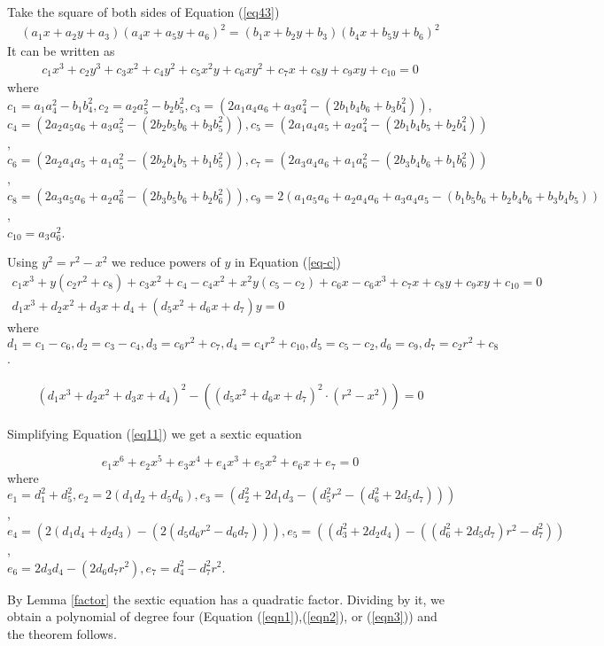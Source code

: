 \documentclass[10pt]{article}
\newenvironment{proof}{\begingroup\Proof}{\qed\endgroup}
\def\Proof{\noindent{\bf Proof\/:}\nobreak}
\def\qed{\unskip~{\vrule height 4pt depth 0pt width 4pt}\medbreak}
\begin{document}
\begin{proof}
Take the square of both sides of Equation (\ref{eq43})
\begin{gather}
(a_1x+a_2y+a_3)(a_4x+a_5y+a_6)^2=
(b_1x+b_2y+b_3)(b_4x+b_5y+b_6)^2 \label{eq57}
\end{gather}
It can be written as
\begin{gather}
c_{1}x^3+c_{2}y^3+ c_{3}x^2+c_{4}y^2+c_{5}x^2y+c_{6}xy^2+c_{7}x+c_{8}y+c_{9}xy+c_{10}=0 
\label{eq-c}
\end{gather}
where $c_{1}=a_1a^2_4-b_1b^2_4, c_{2}=a_2a^2_5-b_2b^2_5, c_{3}=(2a_1a_4a_6+a_3a^2_4-(2b_1b_4b_6+b_3b^2_4))$, \\
$c_{4}=(2a_2a_5a_6+a_3a^2_5-(2b_2b_5b_6+b_3b^2_5)), c_{5}=(2a_1a_4a_5+a_2a^2_4-(2b_1b_4b_5+b_2b^2_4))$,\\
$c_{6}=(2a_2a_4a_5+a_1a^2_5-(2b_2b_4b_5+b_1b^2_5)), c_{7}=(2a_3a_4a_6+a_1a^2_6-(2b_3b_4b_6+b_1b^2_6))$, \\
$c_{8}=(2a_3a_5a_6+a_2a^2_6-(2b_3b_5b_6+b_2b^2_6)), c_{9}=2(a_1a_5a_6+a_2a_4a_6+a_3a_4a_5-(b_1b_5b_6+b_2b_4b_6+b_3b_4b_5))$,\\
$c_{10}=a_3a^2_6$.

Using $y^2=r^2-x^2$ we reduce powers of $y$ in Equation (\ref{eq-c})
\begin{gather}
c_{1}x^3+y(c_2r^2+c_8)+c_3x^2+c_4-c_4x^2+x^2y(c_5-c_2)+
c_6x-c_6x^3+ c_7x+c_8y+c_9xy+c_{10}=0\\
d_1x^3+d_2x^2+d_3x+d_4
+(d_5x^2+d_6x+d_7)y=0 \label{eq49}
\end{gather}
where
$d_1=c_1-c_6, d_2=c_3-c_4,d_3=c_6r^2+c_7,d_4=c_4r^2+c_{10},
d_5=c_5-c_2,d_6=c_9,d_7=c_2r^2+c_8$.

\begin{gather}
\left( d_1x^3+d_2x^2+d_3x+d_4 \right)^2 - ((d_5x^2+d_6x+d_7)^2\cdot(r^2-x^2))=0 \label{eq11}
\end{gather}

Simplifying Equation (\ref{eq11}) we get a sextic equation

\begin{equation}
e_1x^6+e_2x^5+e_3x^4+e_4x^3+e_5x^2+e_6x+e_7=0 \label{eq12}
\end{equation}
where
$e_1=d_1^2+d_5^2, 
e_2=2(d_1d_2+d_5d_6),
e_3=(d_2^2+2d_1d_3-(d_5^2r^2-(d_6^2+2d_5d_7)))$,\\
$e_4=(2(d_1d_4+d_2d_3)-(2(d_5d_6r^2-d_6d_7))),e_5=((d_3^2+2d_2d_4)-((d_6^2+2d_5d_7)r^2-d_7^2))$,\\ 
$e_6=2d_3d_4-(2d_6d_7r^2),e_7=d_4^2-d_7^2r^2$.

By Lemma \ref{factor} the sextic equation has a quadratic factor. 
Dividing by it, we obtain a polynomial of degree four (Equation (\ref{eqn1}),(\ref{eqn2}), or
(\ref{eqn3})) and the theorem follows.
\end{proof}
\end{document}
